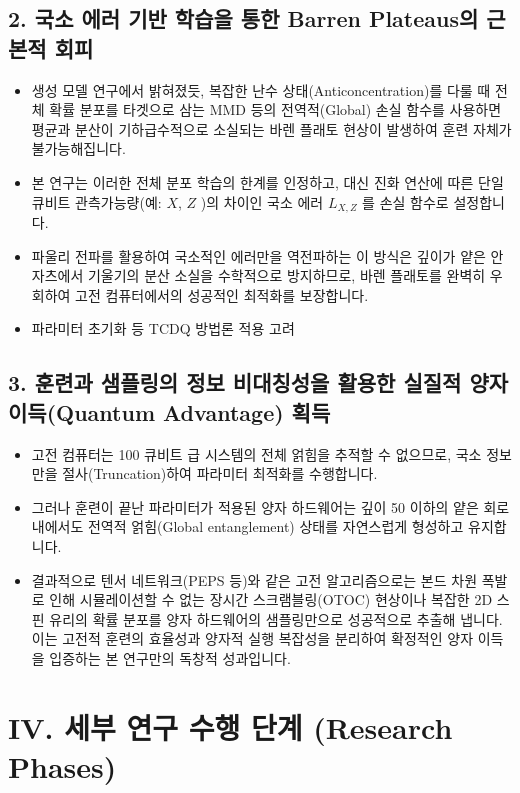 \documentclass[11pt,a4paper]{article}
\begin{document}
\subsection*{2. 국소 에러 기반 학습을 통한 Barren Plateaus의 근본적 회피}
\begin{itemize}
    \item 생성 모델 연구에서 밝혀졌듯, 복잡한 난수 상태(Anticoncentration)를 다룰 때 전체 확률 분포를 타겟으로 삼는 MMD 등의 전역적(Global) 손실 함수를 사용하면 평균과 분산이 기하급수적으로 소실되는 바렌 플래토 현상이 발생하여 훈련 자체가 불가능해집니다.
    \item 본 연구는 이러한 전체 분포 학습의 한계를 인정하고, 대신 진화 연산에 따른 단일 큐비트 관측가능량(예: $X$, $Z$ )의 차이인 국소 에러 $L_{X,Z}$ 를 손실 함수로 설정합니다.
    \item 파울리 전파를 활용하여 국소적인 에러만을 역전파하는 이 방식은 깊이가 얕은 안자츠에서 기울기의 분산 소실을 수학적으로 방지하므로, 바렌 플래토를 완벽히 우회하여 고전 컴퓨터에서의 성공적인 최적화를 보장합니다.
    \item 파라미터 초기화 등 TCDQ 방법론 적용 고려
\end{itemize}

\subsection*{3. 훈련과 샘플링의 정보 비대칭성을 활용한 실질적 양자 이득(Quantum Advantage) 획득}
\begin{itemize}
    \item 고전 컴퓨터는 100 큐비트 급 시스템의 전체 얽힘을 추적할 수 없으므로, 국소 정보만을 절사(Truncation)하여 파라미터 최적화를 수행합니다.
    \item 그러나 훈련이 끝난 파라미터가 적용된 양자 하드웨어는 깊이 50 이하의 얕은 회로 내에서도 전역적 얽힘(Global entanglement) 상태를 자연스럽게 형성하고 유지합니다.
    \item 결과적으로 텐서 네트워크(PEPS 등)와 같은 고전 알고리즘으로는 본드 차원 폭발로 인해 시뮬레이션할 수 없는 장시간 스크램블링(OTOC) 현상이나 복잡한 2D 스핀 유리의 확률 분포를 양자 하드웨어의 샘플링만으로 성공적으로 추출해 냅니다. 이는 고전적 훈련의 효율성과 양자적 실행 복잡성을 분리하여 확정적인 양자 이득을 입증하는 본 연구만의 독창적 성과입니다.
\end{itemize}

\vspace{0.6em}
\section*{IV. 세부 연구 수행 단계 (Research Phases)}
\end{document}
